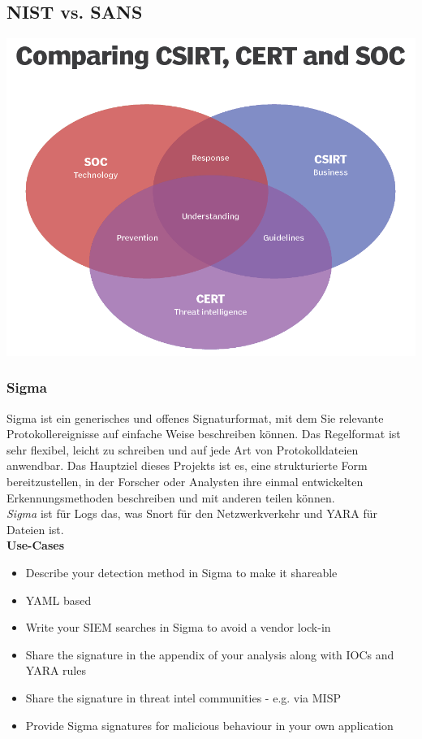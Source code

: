\subsection{NIST vs. SANS}
\begin{center}
    \includegraphics[width=0.8\linewidth]{./img/02-begriffe/soc_cert_csirt}
\end{center}



\subsubsection{Sigma}
Sigma ist ein generisches und offenes Signaturformat, mit dem Sie relevante Protokollereignisse auf einfache Weise beschreiben können. Das Regelformat ist sehr flexibel, leicht zu schreiben und auf jede Art von Protokolldateien anwendbar. Das Hauptziel dieses Projekts ist es, eine strukturierte Form bereitzustellen, in der Forscher oder Analysten ihre einmal entwickelten Erkennungsmethoden beschreiben und mit anderen teilen können.\\
\textit{Sigma} ist für Logs das, was Snort für den Netzwerkverkehr und YARA für Dateien ist.\\
\textbf{Use-Cases}
\begin{itemize}
    \item Describe your detection method in Sigma to make it shareable
    \item YAML based
    \item Write your SIEM searches in Sigma to avoid a vendor lock-in
    \item Share the signature in the appendix of your analysis along with IOCs and YARA rules
    \item Share the signature in threat intel communities - e.g. via MISP
    \item Provide Sigma signatures for malicious behaviour in your own application
\end{itemize}